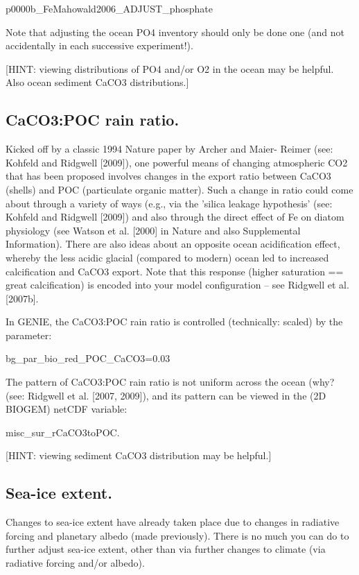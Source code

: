 \documentclass[11pt,fleqn]{book} %
\begin{document}
p0000b\_FeMahowald2006\_ADJUST\_phosphate

Note that adjusting the ocean PO4 inventory should only be done one (and not accidentally
in each successive experiment!).

[HINT: viewing distributions of PO4 and/or O2 in the ocean may be helpful. Also ocean
sediment CaCO3 distributions.]

%
\subsection{CaCO3:POC rain ratio.}

Kicked off by a classic 1994 Nature paper by Archer and Maier-
Reimer (see: Kohfeld and Ridgwell [2009]), one powerful means of changing atmospheric
CO2 that has been proposed involves changes in the export ratio between CaCO3 (shells)
and POC (particulate organic matter). Such a change in ratio could come about through a
variety of ways (e.g., via the 'silica leakage hypothesis' (see: Kohfeld and Ridgwell [2009])
and also through the direct effect of Fe on diatom physiology (see Watson et al. [2000] in
Nature and also Supplemental Information). There are also ideas about an opposite ocean
acidification effect, whereby the less acidic glacial (compared to modern) ocean led to
increased calcification and CaCO3 export. Note that this response (higher saturation ==
great calcification) is encoded into your model configuration – see Ridgwell et al. [2007b].

In GENIE, the CaCO3:POC rain ratio is controlled (technically: scaled) by the parameter:

bg\_par\_bio\_red\_POC\_CaCO3=0.03

The pattern of CaCO3:POC rain ratio is not uniform across the ocean (why? (see: Ridgwell
et al. [2007, 2009]), and its pattern can be viewed in the (2D BIOGEM) netCDF variable:

misc\_sur\_rCaCO3toPOC.

[HINT: viewing sediment CaCO3 distribution may be helpful.]

%
\subsection{Sea-ice extent.}

Changes to sea-ice extent have already taken place due to changes in
radiative forcing and planetary albedo (made previously). There is no much you can do to
further adjust sea-ice extent, other than via further changes to climate (via radiative forcing
and/or albedo).
\end{document}
